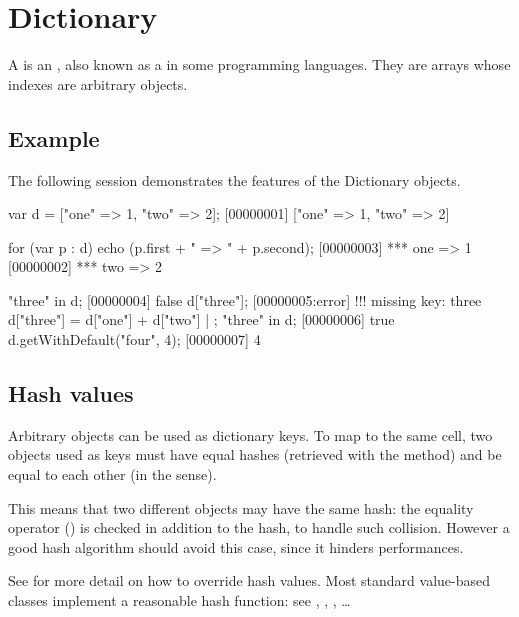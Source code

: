 
\section{Dictionary}

A  is an , also known as a 
in some programming languages.  They are arrays whose indexes are arbitrary
objects.

\subsection{Example}

The following session demonstrates the features of the Dictionary objects.

\begin{urbiscript}[firstnumber=1]
var d = ["one" => 1, "two" => 2];
[00000001] ["one" => 1, "two" => 2]

for (var p : d)
  echo (p.first + " => " + p.second);
[00000003] *** one => 1
[00000002] *** two => 2

"three" in d;
[00000004] false
d["three"];
[00000005:error] !!! missing key: three
d["three"] = d["one"] + d["two"] | {};
"three" in d;
[00000006] true
d.getWithDefault("four", 4);
[00000007] 4
\end{urbiscript}

\subsection{Hash values}
\label{sec:dictionary:hash}

Arbitrary objects can be used as dictionary keys. To map to the same cell,
two objects used as keys must have equal hashes (retrieved with the
 method) and be equal to each other (in the
 sense).

This means that two different objects may have the same hash: the equality
operator () is checked in addition to the hash, to
handle such collision.  However a good hash algorithm should avoid this
case, since it hinders performances.

See  for more detail on how to override hash
values. Most standard value-based classes implement a reasonable hash
function: see , ,
, \ldots

